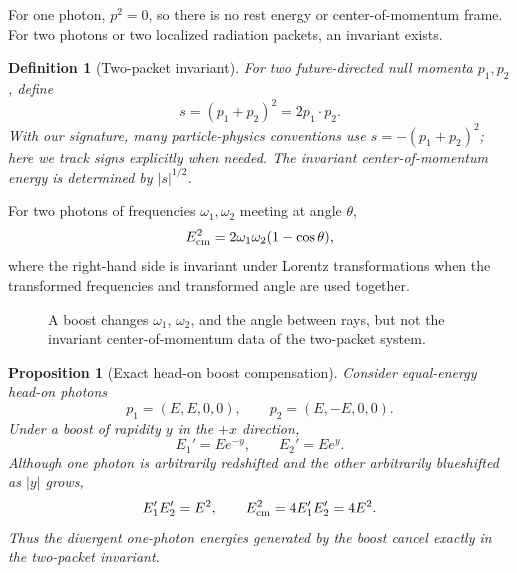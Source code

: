 \documentclass[11pt]{article}
\newtheorem{proposition}{Proposition}
\newtheorem{definition}{Definition}
\theoremstyle{remark}
\begin{document}
For one photon, $p^2=0$, so there is no rest energy or center-of-momentum frame. For two photons or two localized radiation packets, an invariant exists.

\begin{definition}[Two-packet invariant]
For two future-directed null momenta $p_1,p_2$, define
\begin{equation}
s=(p_1+p_2)^2=2p_1\cdot p_2 .
\end{equation}
With our signature, many particle-physics conventions use $s=-(p_1+p_2)^2$; here we track signs explicitly when needed. The invariant center-of-momentum energy is determined by $|s|^{1/2}$.
\end{definition}

For two photons of frequencies $\omega_1,\omega_2$ meeting at angle $\theta$,
\begin{equation}
E_{\rm cm}^2 = 2\omega_1\omega_2(1-\cos\theta),
\end{equation}
where the right-hand side is invariant under Lorentz transformations when the transformed frequencies and transformed angle are used together.

\begin{figure}[h]
\centering
{}
\caption{A boost changes $\omega_1$, $\omega_2$, and the angle between rays, but not the invariant center-of-momentum data of the two-packet system.}
\end{figure}


\begin{proposition}[Exact head-on boost compensation]
Consider equal-energy head-on photons
\begin{equation}
 p_1=(E,E,0,0),\qquad p_2=(E,-E,0,0).
\end{equation}
Under a boost of rapidity $y$ in the $+x$ direction,
\begin{equation}
 E_1'=Ee^{-y},\qquad E_2'=Ee^{y}.
\end{equation}
Although one photon is arbitrarily redshifted and the other arbitrarily blueshifted as $|y|$ grows,
\begin{equation}
 E_1'E_2'=E^2,
 \qquad
 E_{\rm cm}^2=4E_1'E_2'=4E^2.
\end{equation}
Thus the divergent one-photon energies generated by the boost cancel exactly in the two-packet invariant.
\end{proposition}
\end{document}
